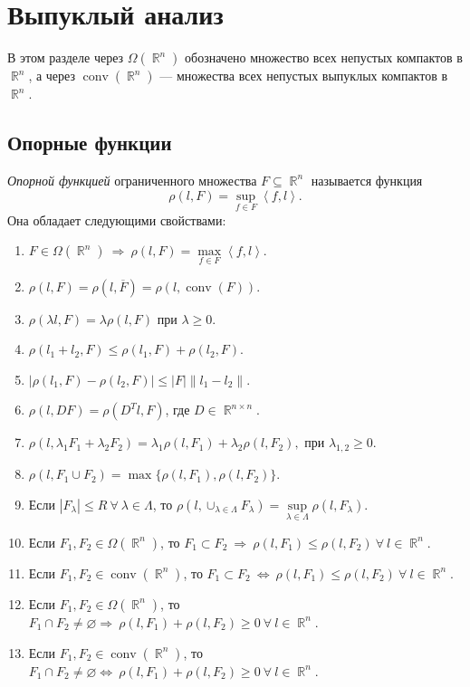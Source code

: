 \documentclass[a4paper,12pt]{scrartcl}
\DeclareMathOperator{\bbr}{\mathbb{R}}
\newcommand{\conv}{\mathop{\mathrm{conv}}}
\newcommand{\scalar}[2]{\left<#1,#2\right>}
\newcommand{\norm}[1]{\left\lVert #1 \right\rVert}
\begin{document}
\section{Выпуклый анализ}
В этом разделе через $\Omega(\bbr^n)$ обозначено множество всех непустых компактов в $\bbr^n$, а через $\conv(\bbr^n)$ --- множества всех непустых выпуклых компактов в $\bbr^n$.
\subsection{Опорные функции}
\textit{Опорной функцией} ограниченного множества $F\subseteq \bbr^n$ называется функция 
$$
\rho(l,F) = \sup\limits_{f\in F}\scalar{f}{l}.
$$
Она обладает следующими свойствами:
\begin{enumerate}
 \item $F\in\Omega(\bbr^n)\ \Rightarrow\ \rho(l,F) = \max\limits_{f\in F}\scalar{f}{l}$.
 \item $\rho(l,F) = \rho(l,\overline{F}) = \rho(l,\conv(F))$.
 \item $\rho(\lambda l,F) = \lambda\rho(l,F)$ при $\lambda \geqslant 0$.
 \item $\rho(l_1 + l_2,F) \leqslant \rho(l_1,F) + \rho(l_2,F)$.
 \item $|\rho(l_1,F) - \rho(l_2,F)| \leqslant |F|\norm{l_1-l_2}$.
 \item $\rho(l, DF) = \rho(D^Tl,F)$, где $D\in\bbr^{n\times n}$.
 \item $\rho(l,\lambda_1F_1 + \lambda_2F_2) = \lambda_1\rho(l,F_1) + \lambda_2\rho(l,F_2),$ при $\lambda_{1,2} \geqslant 0$.
 \item $\rho(l,F_1\cup F_2) = \max\{\rho(l,F_1),\rho(l,F_2)\}$.
 \item Если $|F_\lambda| \leqslant R\ \forall\ \lambda\in\Lambda$, то $\rho(l,\cup_{\lambda\in\Lambda}F_\lambda) = \sup\limits_{\lambda\in\Lambda}\rho(l,F_\lambda)$.
 \item Если $F_1,F_2\in\Omega(\bbr^n)$, то $F_1 \subset F_2\ \Rightarrow\ \rho(l,F_1) \leqslant\rho(l,F_2)\ \forall\ l\in\bbr^n$.
 \item Если $F_1,F_2\in\conv(\bbr^n)$, то $F_1 \subset F_2\ \Leftrightarrow\ \rho(l,F_1) \leqslant\rho(l,F_2)\ \forall\ l\in\bbr^n$.
 \item Если $F_1,F_2\in\Omega(\bbr^n)$, то $F_1 \cap F_2\neq\varnothing \Rightarrow\ \rho(l,F_1) + \rho(l,F_2) \geqslant 0\ \forall\ l\in\bbr^n$.
 \item Если $F_1,F_2\in\conv(\bbr^n)$, то $F_1 \cap F_2\neq\varnothing \Leftrightarrow\ \rho(l,F_1) + \rho(l,F_2) \geqslant 0\ \forall\ l\in\bbr^n$.

\end{enumerate}
\end{document}
